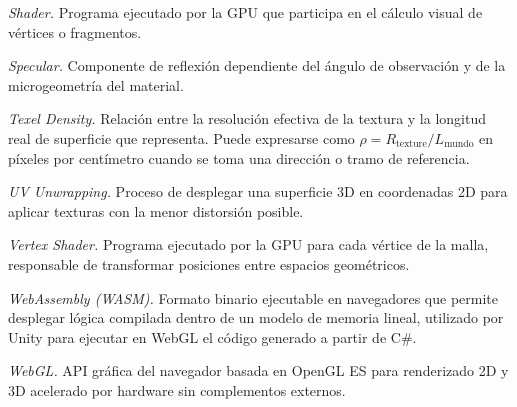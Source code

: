 \textit{Shader.} Programa ejecutado por la GPU que participa en el c\'alculo visual de v\'ertices o fragmentos.

\textit{Specular.} Componente de reflexi\'on dependiente del \'angulo de observaci\'on y de la microgeometr\'ia del material.

\textit{Texel Density.} Relaci\'on entre la resoluci\'on efectiva de la textura y la longitud real de superficie que representa. Puede expresarse como $\rho = R_{\text{texture}} / L_{\text{mundo}}$ en p\'ixeles por cent\'imetro cuando se toma una direcci\'on o tramo de referencia.

\textit{UV Unwrapping.} Proceso de desplegar una superficie 3D en coordenadas 2D para aplicar texturas con la menor distorsi\'on posible.

\textit{Vertex Shader.} Programa ejecutado por la GPU para cada v\'ertice de la malla, responsable de transformar posiciones entre espacios geom\'etricos.

\textit{WebAssembly (WASM).} Formato binario ejecutable en navegadores que permite desplegar l\'ogica compilada dentro de un modelo de memoria lineal, utilizado por Unity para ejecutar en WebGL el c\'odigo generado a partir de C\#.

\textit{WebGL.} API gr\'afica del navegador basada en OpenGL ES para renderizado 2D y 3D acelerado por hardware sin complementos externos.

\newpage
